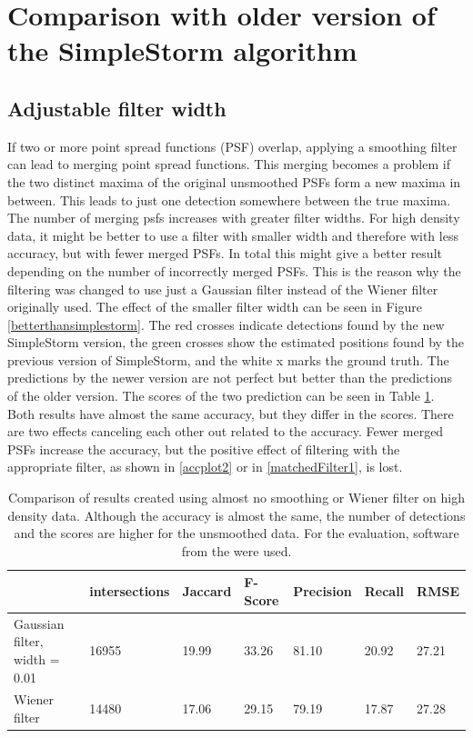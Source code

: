 \section{Comparison with older version of the SimpleStorm algorithm}
\subsection{Adjustable filter width} \label{sectionFilterisEvil}
If two or more point spread functions (PSF) overlap, applying a smoothing filter can lead to merging point spread functions. This merging becomes a problem if the two distinct maxima of the original unsmoothed PSFs form a new maxima in between. This leads to just one detection somewhere between the true maxima. The number of merging psfs increases with greater filter widths. For high density data, it might be better to use a filter with smaller width and therefore with less accuracy, but with fewer merged PSFs. In total this might give a better result depending on the number of incorrectly merged PSFs. This is the reason why the filtering was changed to use just a Gaussian filter instead of the Wiener filter originally used. 
The effect of the smaller filter width can be seen in Figure \ref{betterthansimplestorm}. The red crosses indicate detections found by the new SimpleStorm version, the green crosses show the estimated positions found by the previous version of SimpleStorm, and the white x marks the ground truth. The predictions by the newer version are not perfect but better than the predictions of the older version. The scores of the two prediction can be seen in Table \ref{tabelbetterthansimplestorm}. Both results have almost the same accuracy, but they differ in the scores. There are two effects canceling each other out related to the accuracy. Fewer merged PSFs increase the accuracy, but the positive effect of filtering with the appropriate filter, as shown in \ref{accplot2} or in \ref{matchedFilter1}, is lost. 

\begin{table}
\caption{Comparison of results created using almost no smoothing or Wiener filter on high density data. Although the accuracy is almost the same, the number of detections and the scores are higher for the unsmoothed data. For the evaluation, software from the \cite{challenge} were used.}
\begin{tabular}{l|llllll}
&intersections&Jaccard&F-Score&Precision&Recall&RMSE\\ \hline
Gaussian filter, width = 0.01& 16955&19.99&33.26&81.10&20.92&27.21\\
Wiener filter& 14480&17.06&29.15&79.19&17.87&27.28
\end{tabular} \label{tabelbetterthansimplestorm}

\end{table}


